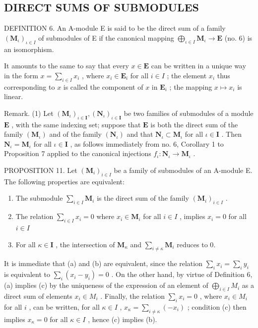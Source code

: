 \subsection{DIRECT SUMS OF SUBMODULES}

DEFINITION 6. An A-module E is said to be the direct sum of a family \((\mathbf{M}_{\iota})_{\iota \in I}\) of submodules of E if the canonical mapping \(\bigoplus_{\iota \in I} \mathbf{M}_{\iota} \to \mathbf{E}\) (no. 6) is an isomorphism.

It amounts to the same to say that every \(x \in \mathbf{E}\) can be written in a unique way in the form \(x = \sum_{i \in I} x_i\) , where \(x_i \in \mathbf{E}_i\) for all \(i \in I\) ; the element \(x_i\) thus corresponding to \(x\) is called the component of \(x\) in \(\mathbf{E}_i\) ; the mapping \(x \mapsto x_i\) is linear.

Remark. (1) Let \((\mathbf{M}_{\iota})_{\iota \in \mathbf{I}}, (\mathbf{N}_{\iota})_{\iota \in \mathbf{I}}\) be two families of submodules of a module \(\mathbf{E}\) , with the same indexing set; suppose that \(\mathbf{E}\) is both the direct sum of the family \((\mathbf{M}_{\iota})\) and of the family \((\mathbf{N}_{\iota})\) and that \(\mathbf{N}_{\iota} \subset \mathbf{M}_{\iota}\) for all \(\iota \in \mathbf{I}\) . Then \(\mathbf{N}_{\iota} = \mathbf{M}_{\iota}\) for all \(\iota \in \mathbf{I}\) , as follows immediately from no. 6, Corollary 1 to Proposition 7 applied to the canonical injections \(f_{\iota}: \mathbf{N}_{\iota} \to \mathbf{M}_{\iota}\) .

PROPOSITION 11. Let \((\mathbf{M}_{i})_{i\in I}\) be a family of submodules of an A-module E. The following properties are equivalent:

\begin{enumerate}
\def\labelenumi{(\alph{enumi})}
\item
  The submodule \(\sum_{i\in I}\mathbf{M}_i\) is the direct sum of the family \((\mathbf{M}_i)_{i\in I}\) .
\item
  The relation \(\sum_{i\in I}x_i = 0\) where \(x_{i}\in \mathbf{M}_{i}\) for all \(i\in I\) , implies \(x_{i} = 0\) for all \(i\in I\)
\item
  For all \(\kappa \in \mathbf{I}\) , the intersection of \(\mathbf{M}_{\kappa}\) and \(\sum_{i \neq \kappa} \mathbf{M}_i\) reduces to 0.
\end{enumerate}

It is immediate that (a) and (b) are equivalent, since the relation \(\sum_{i} x_{i} = \sum_{i} y_{i}\) is equivalent to \(\sum_{i} (x_{i} - y_{i}) = 0\) . On the other hand, by virtue of Definition 6, (a) implies (c) by the uniqueness of the expression of an element of \(\bigoplus_{i \in I} M_{i}\) as a direct sum of elements \(x_{i} \in M_{i}\) . Finally, the relation \(\sum_{i} x_{i} = 0\) , where \(x_{i} \in M_{i}\) for all \(i\) , can be written, for all \(\kappa \in I\) , \(x_{\kappa} = \sum_{i \neq \kappa} (-x_{i})\) ; condition (c) then implies \(x_{\kappa} = 0\) for all \(\kappa \in I\) , hence (c) implies (b).

